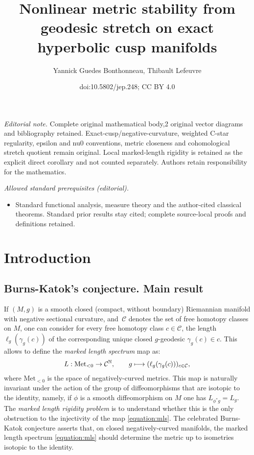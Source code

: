 \documentclass[10pt]{amsart}
\title{Nonlinear metric stability from geodesic stretch on exact hyperbolic cusp manifolds}
\author{Yannick Guedes Bonthonneau, Thibault Lefeuvre}
\date{doi:10.5802/jep.248; CC BY 4.0}
\newcommand\mto{\mathchoice{\longmapsto}{\mapsto}{\mapsto}{\mapsto}}
\newcommand{\N}{\mathbb{N}}
\newcommand{\mc}{\mathcal}
\theoremstyle{plain}
\theoremstyle{definition}
\providecommand{\mainmatter}{}\providecommand{\backmatter}{}
\begin{document}
\maketitle
\noindent\textit{Editorial note.} Complete original mathematical body,2 original vector diagrams and bibliography retained. Exact-cusp/negative-curvature, weighted C-star regularity, epsilon and nu0 conventions, metric closeness and cohomological stretch quotient remain original. Local marked-length rigidity is retained as the explicit direct corollary and not counted separately. Authors retain responsibility for the mathematics.\par\medskip
\noindent\textit{Allowed standard prerequisites (editorial).}\begin{itemize}
\item Standard functional analysis, measure theory and the author-cited classical theorems. Standard prior results stay cited; complete source-local proofs and definitions retained.
\end{itemize}\medskip
\vspace*{-\baselineskip}
\tableofcontents
\mainmatter

\section{Introduction}

\subsection{Burns-Katok's conjecture. Main result}

If $(M,g)$ is a smooth closed (compact, without boundary) Riemannian manifold with negative sectional curvature, and~$\mc{C}$ denotes the set of free homotopy classes on $M$, one can consider for every free homotopy class $c \in \mc{C}$, the length $\ell_g(\gamma_g(c))$ of the corresponding unique closed $g$-geodesic $\gamma_g(c) \in c$. This allows to define the \emph{marked length spectrum} map as:
\begin{equation}
\label{equation:mls}
L : \mathrm{Met}_{< 0} \to \mc{C}^\N, \qquad g \mto (\ell_g(\gamma_g(c)))_{c \in \mc{C}},
\end{equation}
where $\mathrm{Met}_{< 0}$ is the space of negatively-curved metrics. This map is naturally invariant under the action of the group of diffeomorphisms that are isotopic to the identity, namely, if $\phi$ is a smooth diffeomorphism on $M$ one has $L_{\phi^*g}=L_{g}$. The \emph{marked length rigidity problem} is to understand whether this is the only obstruction to the injectivity of the map \eqref{equation:mls}. The celebrated Burns-Katok conjecture \cite{Burns-Katok-85} asserts that, on closed negatively-curved manifolds, the marked length spectrum \eqref{equation:mls} should determine the metric up to isometries isotopic to the identity.
\end{document}
